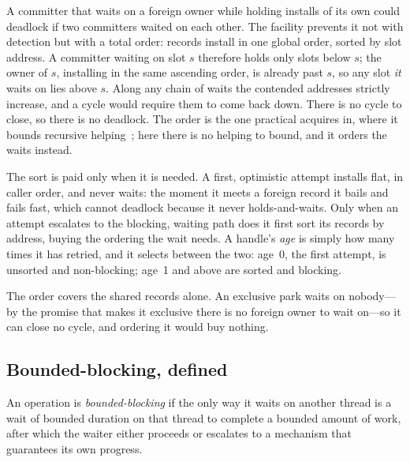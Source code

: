\documentclass[11pt]{article}
\begin{document}
A committer that waits on a foreign owner while holding installs of its own could
deadlock if two committers waited on each other. The facility prevents it not with
detection but with a total order: records install in one global order, sorted by
slot address. A committer waiting on slot $s$ therefore holds only slots below
$s$; the owner of $s$, installing in the same ascending order, is already past
$s$, so any slot \emph{it} waits on lies above $s$. Along any chain of waits the
contended addresses strictly increase, and a cycle would require them to come
back down. There is no cycle to close, so there is no deadlock. The order is the
one practical \mcas acquires in, where it bounds recursive
helping~\citep{fraser2004lockfreedom}; here there is no helping to bound, and it
orders the waits instead.

The sort is paid only when it is needed. A first, optimistic attempt installs
flat, in caller order, and never waits: the moment it meets a foreign record it
bails and fails fast, which cannot deadlock because it never holds-and-waits. Only
when an attempt escalates to the blocking, waiting path does it first sort its
records by address, buying the ordering the wait needs. A handle's \emph{age} is
simply how many times it has retried, and it selects between the two: age~0, the
first attempt, is unsorted and non-blocking; age~1 and above are sorted and
blocking.

The order covers the shared records alone. An exclusive park waits on nobody---by
the promise that makes it exclusive there is no foreign owner to wait on---so it
can close no cycle, and ordering it would buy nothing.

\subsection{Bounded-blocking, defined}
\label{sec:boundedblocking}

\begin{definition}
\label{def:boundedblocking}
An operation is \emph{bounded-blocking} if the only way it waits on another
thread is a wait of bounded duration on that thread to complete a bounded amount
of work, after which the waiter either proceeds or escalates to a mechanism that
guarantees its own progress.
\end{definition}
\end{document}
